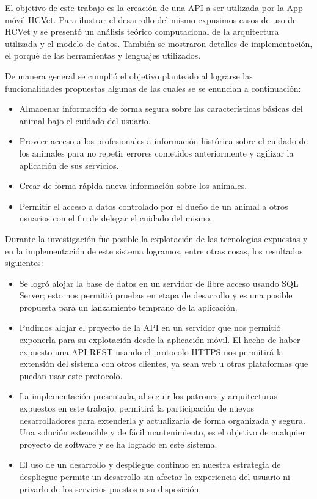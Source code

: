 \begin{conclusions}
    
    El objetivo de este trabajo es la creación de una API a ser utilizada por la App móvil HCVet. Para ilustrar el desarrollo del mismo expusimos casos de uso de HCVet y se presentó un análisis teórico computacional de la arquitectura utilizada y el modelo de datos. También se mostraron detalles de implementación, el porqué de las herramientas y lenguajes utilizados.
    
De manera general se cumplió el objetivo planteado al lograrse las funcionalidades propuestas algunas de las cuales se se enuncian a continuación:
    \begin{itemize}
    	\item Almacenar información de forma segura sobre las características básicas del animal bajo el cuidado del usuario.
    	\item Proveer acceso a los profesionales a información histórica sobre el cuidado de los animales para no repetir errores cometidos anteriormente y agilizar la aplicación de sus servicios.
    	\item Crear de forma rápida nueva información sobre los animales.
    	\item Permitir el acceso a datos controlado por el dueño de un animal a otros usuarios con el fin de delegar el cuidado del mismo.
    \end{itemize}
Durante la investigación fue posible la explotación de las tecnologías expuestas y en la implementación de este sistema logramos, entre otras cosas, los resultados siguientes:
\begin{itemize}
	\item Se logró alojar la base de datos en un servidor de libre acceso usando SQL Server; esto nos permitió pruebas en etapa de desarrollo y  es una posible propuesta para un lanzamiento temprano de la aplicación.
	\item Pudimos alojar el proyecto de la API en un servidor que nos permitió exponerla para su explotación desde la aplicación móvil. El hecho de haber expuesto una API REST usando el protocolo HTTPS nos permitirá la extensión del sistema con otros clientes, ya sean web u otras plataformas que puedan usar este protocolo.
	\item La implementación presentada, al seguir los patrones y arquitecturas expuestos en este trabajo, permitirá la participación de nuevos desarrolladores para extenderla y actualizarla de forma organizada y segura. Una solución extensible y de fácil mantenimiento, es el objetivo de cualquier proyecto de software y se ha logrado en este sistema.
	\item El uso de un desarrollo y despliegue continuo en nuestra estrategia de despliegue permite un desarrollo sin afectar la experiencia del usuario ni privarlo de los servicios puestos a su disposición.
\end{itemize}

\end{conclusions}
